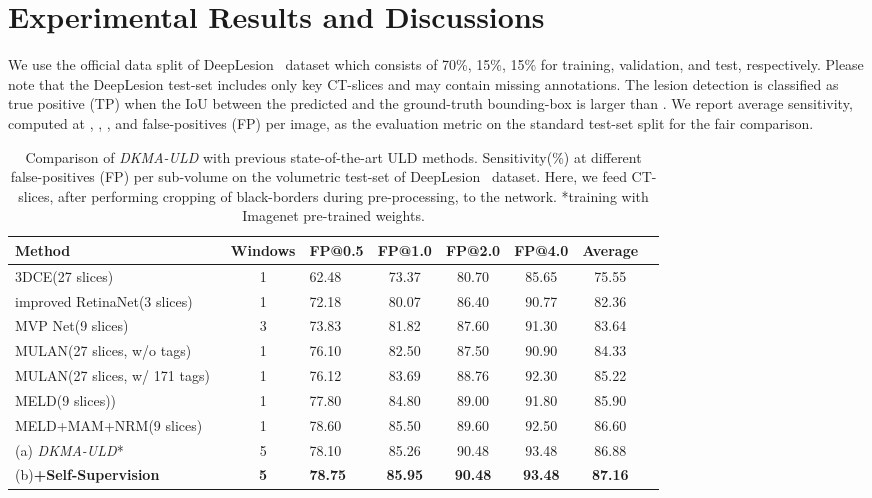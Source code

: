 \documentclass{bmvc2k}
\begin{document}
\vspace{-3mm}
\section{Experimental Results and Discussions}
\label{sec:exp-res}
We use the official data split of DeepLesion~\cite{yan2018deeplesion} dataset which consists of 70\%, 15\%, 15\% for training, validation, and test, respectively. Please note that the DeepLesion test-set includes only key CT-slices and may contain missing annotations. The lesion detection is classified as true positive (TP) when the IoU between the predicted and the ground-truth bounding-box is larger than . We report average sensitivity, computed at , , , and  false-positives (FP) per image, as the evaluation metric on the standard test-set split for the fair comparison.\\


\begin{table}[t]
\begin{center}
\setlength{\tabcolsep}{0.1\tabcolsep}\begin{tabular}{|l|c|l|c|c|c|c|c|}
\hline
\textbf{Method} & \textbf{Windows}  & \textbf{FP@0.5} & \textbf{FP@1.0} & \textbf{FP@2.0} & \textbf{FP@4.0} & \textbf{Average}
\\\hline
3DCE(27 slices)~\cite{3dce} & 1  & 62.48 & 73.37 & 80.70 & 85.65 & 75.55 \\
improved RetinaNet(3 slices)~\cite{retinanet_improv} & 1  & 72.18 & 80.07 & 86.40 & 90.77 & 82.36 \\
MVP Net(9 slices)~\cite{li2019mvp} & 3 & 73.83 & 81.82 & 87.60 & 91.30 & 83.64 \\
MULAN(27 slices, w/o tags)~\cite{yan2019mulan} & 1  & 76.10 & 82.50 & 87.50 & 90.90 & 84.33 \\
MULAN(27 slices, w/ 171 tags)~\cite{yan2019mulan} & 1  & 76.12 & 83.69 & 88.76 & 92.30 & 85.22 \\ 
MELD(9 slices))~\cite{meld} & 1  & 77.80 & 84.80 & 89.00 & 91.80 & 85.90\\
MELD+MAM+NRM(9 slices)~\cite{meld} & 1  & 78.60 & 85.50 & 89.60 & 92.50 & 86.60 \\ \hline  

(a) \emph{DKMA-ULD}* & 5 & 78.10 & 85.26 & 90.48 & 93.48 & 86.88 \\
(b)\textbf{+Self-Supervision} & \textbf{5} & \textbf{78.75} & \textbf{85.95} & \textbf{90.48} & \textbf{93.48} & \textbf{87.16}\\

\hline
\end{tabular}
\vspace{2mm}
\caption{\small{Comparison of \emph{DKMA-ULD} with previous state-of-the-art ULD methods. Sensitivity(\%) at different false-positives (FP) per sub-volume on the volumetric test-set of DeepLesion~\cite{yan2018deeplesion} dataset. Here, we feed CT-slices, after performing cropping of black-borders during pre-processing, to the network. *training with Imagenet pre-trained weights.}}
\label{tab:comp-sota}
\end{center}
\vspace{-5mm}
\end{table}
\end{document}
